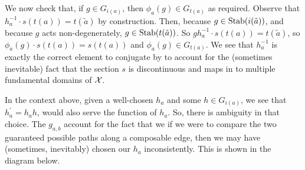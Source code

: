 We now check that, if $g \in G_{i(a)}$, then  $\phi_a(g) \in G_{t(a)}$ as required.
Observe that $h_a^{-1} \cdot s(t(a)) = t(\tilde{a})$ by construction.
Then, because $g \in \operatorname{Stab}(i(\tilde{a}))$, and because  $g$ acts non-degenerately,  $g \in \operatorname{Stab}(t(\tilde{a}))$.
So  $gh_a^{-1} \cdot s(t(a)) = t(\tilde{a})$, so $\phi_a(g) \cdot s(t(a)) = s(t(a))$ and  $\phi_a(g) \in G_{t(a)}$.
We see that $h_a^{-1}$ is exactly the correct element to conjugate by to account for the (sometimes inevitable) fact that the section $s$ is discontinuous and maps in to multiple fundamental domains of $\mathcal{X}$.

In the context above, given a well-chosen $h_a$ and some $h \in G_{i(a)}$, we see that $h^\prime_a = h_ah$, would also serve the function of $h_a$.
So, there is ambiguity in that choice.
The $g_{a,b}$ account for the fact that we if we were to compare the two guaranteed possible paths along a composable edge, then we may have (sometimes, inevitably) chosen our $h_a$ inconsistently.
This is shown in the diagram below.

\begin{center}
\end{center}


